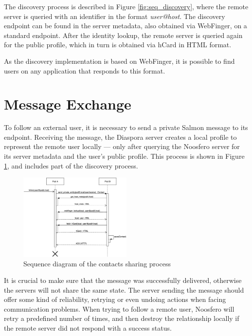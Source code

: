 The discovery process is described in Figure \ref{fig:seq_discovery},
where the remote server is queried with an identifier in the format
\textit{user@host}. The discovery endpoint can be found in the server
metadata, also obtained via WebFinger, on a standard endpoint. After the
identity lookup, the remote server is queried again for the public
profile, which in turn is obtained via hCard in HTML format.

As the discovery implementation is based on WebFinger, it is possible to
find users on any application that responds to this format.

\section{Message Exchange}

To follow an external user, it is necessary to send a private Salmon
message to its endpoint. Receiving the message, the Diaspora server
creates a local profile to represent the remote user locally --- only
after querying the Noosfero server for its server metadata and the
user's public profile. This process is shown in Figure
\ref{fig:seq_contact}, and includes part of the discovery process.

\begin{figure}[h]
	\centering
		\includegraphics[width=0.5\textwidth]{figures/seq_contato.eps}
	\caption{Sequence diagram of the contacts sharing process}
	\label{fig:seq_contact}
\end{figure}

It is crucial to make sure that the message was successfully delivered,
otherwise the servers will not share the same state. The server sending
the message should offer some kind of reliability, retrying or even
undoing actions when facing communication problems. When trying to
follow a remote user, Noosfero will retry a predefined number of times,
and then destroy the relationship locally if the remote server did not
respond with a success status.

